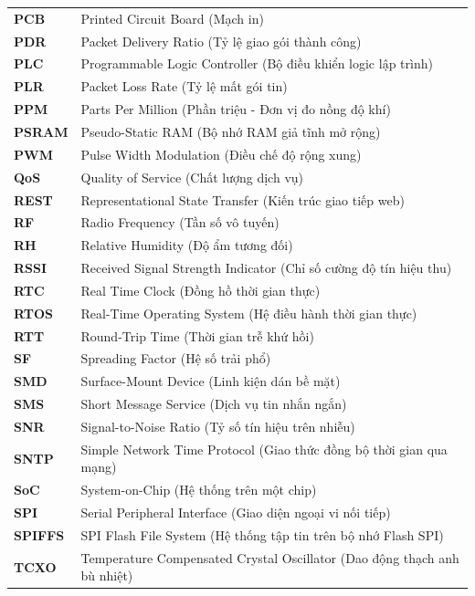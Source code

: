 \begin{longtable}{@{} p{} p{} @{}}
\textbf{PCB}    & Printed Circuit Board (Mạch in) \\
\textbf{PDR}    & Packet Delivery Ratio (Tỷ lệ giao gói thành công) \\
\textbf{PLC}    & Programmable Logic Controller (Bộ điều khiển logic lập trình) \\
\textbf{PLR}    & Packet Loss Rate (Tỷ lệ mất gói tin) \\
\textbf{PPM}    & Parts Per Million (Phần triệu - Đơn vị đo nồng độ khí) \\
\textbf{PSRAM}  & Pseudo-Static RAM (Bộ nhớ RAM giả tĩnh mở rộng) \\
\textbf{PWM}    & Pulse Width Modulation (Điều chế độ rộng xung) \\
\textbf{QoS}    & Quality of Service (Chất lượng dịch vụ) \\
\textbf{REST}   & Representational State Transfer (Kiến trúc giao tiếp web) \\
\textbf{RF}     & Radio Frequency (Tần số vô tuyến) \\
\textbf{RH}     & Relative Humidity (Độ ẩm tương đối) \\
\textbf{RSSI}   & Received Signal Strength Indicator (Chỉ số cường độ tín hiệu thu) \\
\textbf{RTC}    & Real Time Clock (Đồng hồ thời gian thực) \\
\textbf{RTOS}   & Real-Time Operating System (Hệ điều hành thời gian thực) \\
\textbf{RTT}    & Round-Trip Time (Thời gian trễ khứ hồi) \\
\textbf{SF}     & Spreading Factor (Hệ số trải phổ) \\
\textbf{SMD}    & Surface-Mount Device (Linh kiện dán bề mặt) \\
\textbf{SMS}    & Short Message Service (Dịch vụ tin nhắn ngắn) \\
\textbf{SNR}    & Signal-to-Noise Ratio (Tỷ số tín hiệu trên nhiễu) \\
\textbf{SNTP}   & Simple Network Time Protocol (Giao thức đồng bộ thời gian qua mạng) \\
\textbf{SoC}    & System-on-Chip (Hệ thống trên một chip) \\
\textbf{SPI}    & Serial Peripheral Interface (Giao diện ngoại vi nối tiếp) \\
\textbf{SPIFFS} & SPI Flash File System (Hệ thống tập tin trên bộ nhớ Flash SPI) \\
\textbf{TCXO}   & Temperature Compensated Crystal Oscillator (Dao động thạch anh bù nhiệt) \\

\end{longtable}
